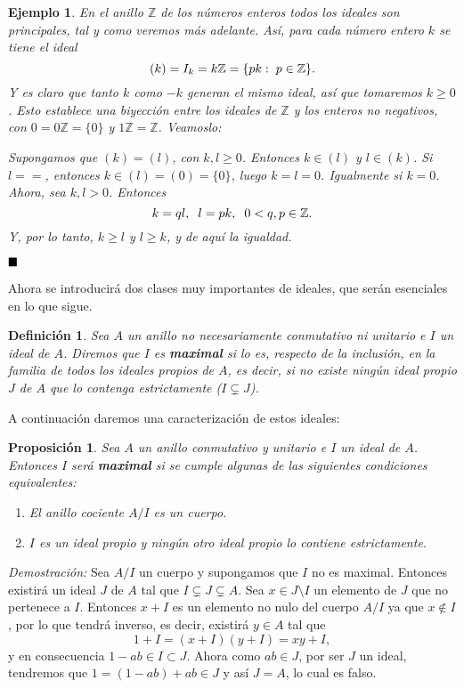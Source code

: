 \documentclass[12pt]{article}
\newtheorem{proposition}[theorem]{Proposición}
\newtheorem{definition}[theorem]{Definición}
\newtheorem{example}{Ejemplo}[theorem]
\begin{document}
\begin{example} En el anillo $\mathbb{Z}$ de los números enteros todos los ideales son principales, tal y como veremos más adelante. Así, para cada número entero $k$ se tiene el ideal $$(k) = I_{k} = k\mathbb{Z} = \lbrace pk : \hspace{0.1cm} p \in \mathbb{Z} \rbrace.$$ Y es claro que tanto $k$ como $-k$ generan el mismo ideal, así que tomaremos $k \geq 0$. Esto establece una biyección entre los ideales de $\mathbb{Z}$ y los enteros no negativos, con $0 = 0\mathbb{Z} = \lbrace 0 \rbrace$ y $1\mathbb{Z} = \mathbb{Z}$. Veamoslo:

Supongamos que $(k) = (l)$, con $k, l \geq 0$. Entonces $k \in (l)$ y $l \in (k)$. Si $l==$, entonces $k \in (l) = (0) = \lbrace 0 \rbrace$, luego $k = l = 0$. Igualmente si $k = 0$. Ahora, sea $k,l > 0$. Entonces $$k = ql, \hspace{0.2cm} l = pk, \hspace{0.2cm} 0 < q, p \in \mathbb{Z}.$$ Y, por lo tanto, $k \geq l$ y $l \geq k$, y de aquí la igualdad.
\end{example}

$\hfill \blacksquare$

Ahora se introducirá dos clases muy importantes de ideales, que serán esenciales en lo que sigue. 

\begin{definition}Sea $A$ un anillo no necesariamente conmutativo ni unitario e $I$ un ideal de $A$. Diremos que $I$ es \textbf{maximal} si lo es, respecto de la inclusión, en la familia de todos los ideales propios de $A$, es decir, si no existe ningún ideal propio  $J$ de $A$ que lo contenga estrictamente ($I \subsetneq J$).
\end{definition}

A continuación daremos una caracterización de estos ideales:

\begin{proposition} Sea $A$ un anillo conmutativo y unitario e $I$ un ideal de $A$. Entonces $I$ será \textbf{maximal} si se cumple algunas  de las siguientes condiciones equivalentes: \begin{enumerate}
\item El anillo cociente $A/I$ es un cuerpo.
\item $I$ es un ideal propio y ningún otro ideal propio lo contiene estrictamente.
\end{enumerate}
\end{proposition}
\emph{Demostración: } Sea $A/I$ un cuerpo y supongamos que $I$ no es maximal. Entonces existirá un ideal $J$ de $A$ tal que $I \subsetneq J \subsetneq A$. Sea $x \in J \setminus I$ un elemento de $J$ que no pertenece a $I$. Entonces $x + I$ es un elemento no nulo del cuerpo $A/I$ ya que $x \notin I$, por lo que tendrá inverso, es decir, existirá $y \in A$ tal que $$1 + I = (x + I)(y + I)= xy + I,$$ y en consecuencia $1 -ab \in I \subset J$. Ahora como $ab \in J$, por ser $J$ un ideal, tendremos que $1 = (1- ab) + ab \in J$ y así $J = A$, lo cual es falso.
\end{document}
